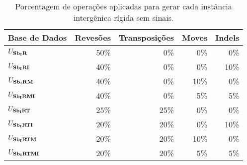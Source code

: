 \begin{table}[!htb]\label{table:GSGLMSJY}
  \caption{Porcentagem de operações aplicadas para gerar cada instância intergênica rígida sem sinais.}
  \centering
  \begin{tabular}{|p{3cm}|r|r|r|r|}
    \hline
    Base de Dados           & Revesões   & Transposições   & Moves   & Indels    \\ \hline
    $U_{\textbf{Sb\textsubscript{I}R}}{}$             & 50\%       & 0\%             &  0\%     &  0\%       \\ \hline
    $U_{\textbf{Sb\textsubscript{I}RI}}{}$            & 40\%       & 0\%             &  0\%     & 10\%       \\ \hline
    $U_{\textbf{Sb\textsubscript{I}RM}}{}$            & 40\%       & 0\%             & 10\%     &  0\%       \\ \hline
    $U_{\textbf{Sb\textsubscript{I}RMI}}{}$           & 40\%       & 0\%             &  5\%     &  5\%       \\ \hline
    $U_{\textbf{Sb\textsubscript{I}RT}}{}$            & 25\%       & 25\%            &  0\%     &  0\%       \\ \hline
    $U_{\textbf{Sb\textsubscript{I}RTI}}{}$           & 20\%       & 20\%            &  0\%     & 10\%       \\ \hline
    $U_{\textbf{Sb\textsubscript{I}RTM}}{}$           & 20\%       & 20\%            & 10\%     &  0\%       \\ \hline
    $U_{\textbf{Sb\textsubscript{I}RTMI}}{}$          & 20\%       & 20\%            &  5\%     &  5\%       \\ \hline
  \end{tabular}
\end{table}